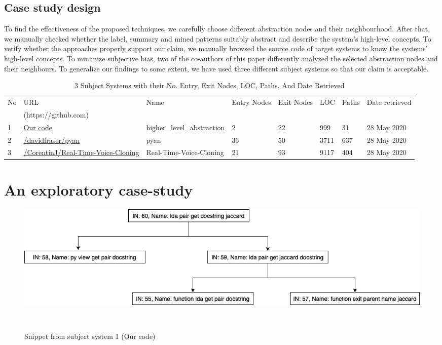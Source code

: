 \subsection{Case study design}
To find the effectiveness of the proposed techniques, we carefully choose different abstraction nodes and their neighbourhood. After that, we manually checked whether the label, summary and mined patterns suitably abstract and describe the system's high-level concepts. To verify whether the approaches properly support our claim, we manually browsed the source code of target systems to know the systems' high-level concepts. To minimize subjective bias, two of the co-authors of this paper differently analyzed the selected abstraction nodes and their neighbours. To generalize our findings to some extent, we have used three different subject systems so that our claim is acceptable.

\begin{table}%
 \caption{3 Subject Systems with their No. Entry, Exit Nodes, LOC, Paths, And Date Retrieved}
\centering
\begin{tabular}{l|l|l|l|l|l|l|l}
No & URL & Name & Entry Nodes & Exit Nodes & LOC & Paths & Date retrieved\\
 & (https://github.com) &  &  &   & & &\\
\hline
1 & \url{Our code}& higher\_level\_abstraction & 2 & 22 & 999 & 31 &  28 May 2020\\
2 & \url{/davidfraser/pyan} & pyan & 36 & 50 & 3711 & 637 & 28 May 2020\\
3 & \url{/CorentinJ/Real-Time-Voice-Cloning}& Real-Time-Voice-Cloning & 21 & 93 & 9117 & 404 & 28 May 2020\\


\end{tabular}
\label{table:subject_systems}
\end{table}

\section{An exploratory case-study}
\begin{figure}[tb]
  \centering
  \includegraphics[width=1\columnwidth]{figures/hla2/rq1_hla1.png}
  \caption{Snippet from subject system 1 (Our code)}~\label{fig:rq1_hla1}
\end{figure}

